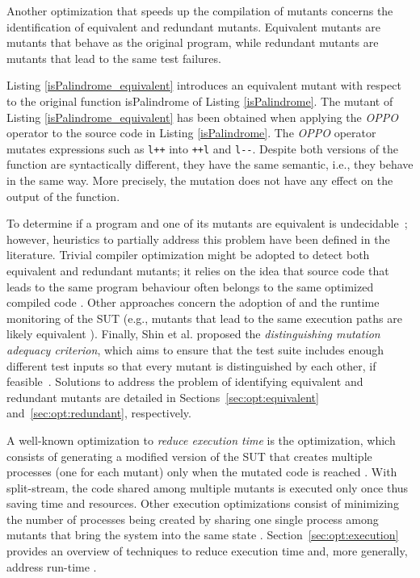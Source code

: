 Another optimization that speeds up the compilation of mutants concerns the identification of equivalent and redundant mutants. Equivalent mutants are mutants that behave as the original program, while redundant mutants are mutants that lead to the same test failures. 




Listing \ref{isPalindrome_equivalent} introduces an equivalent mutant with respect to the original function isPalindrome of Listing \ref{isPalindrome}. The mutant of Listing \ref{isPalindrome_equivalent} has been obtained when applying the \textit{OPPO} operator to the source code in Listing \ref{isPalindrome}. The \textit{OPPO} operator mutates expressions such as \texttt{l++} into \texttt{++l} and \texttt{l-}\texttt{-}.
Despite both versions of the function are syntactically different, they have the same semantic, i.e., they behave in the same way. More precisely, the mutation does not have any effect on the output of the function.

To determine if a program and one of its mutants are
equivalent is undecidable~\cite{Budd:1982}; however, heuristics to partially address this problem have been defined in the literature.
Trivial compiler optimization might be adopted to detect both equivalent and redundant mutants; it relies on the idea that source code that leads to the same program behaviour often belongs to the same optimized compiled code \cite{papadakis2015trivial}. Other approaches concern the adoption of  \cite{papadakis2012mutation,kurtz2015static} and the runtime monitoring of the SUT (e.g., mutants that lead to the same execution paths are likely equivalent \cite{schuler2013covering}). Finally, Shin et al. proposed the \emph{distinguishing mutation adequacy criterion}, which aims to ensure that the test suite includes enough different test inputs so that every mutant is distinguished by each other, if feasible~\cite{shin2017theoretical}. 
Solutions to address the problem of identifying equivalent and redundant mutants are detailed in Sections~\ref{sec:opt:equivalent} and~\ref{sec:opt:redundant}, respectively.


A well-known optimization to \emph{reduce execution time} is the  optimization, which consists of generating a modified version of the SUT that creates multiple processes (one for each mutant) only when the mutated code is reached \cite{tokumoto2016muvm}. With split-stream, the code shared among multiple mutants is executed only once thus saving time and resources. Other execution optimizations consist of minimizing the number of processes being created by sharing one single process among mutants that bring the system into the same state \cite{wang2017faster}.
Section~\ref{sec:opt:execution} provides an overview of techniques to reduce execution time and, more generally, address run-time .

